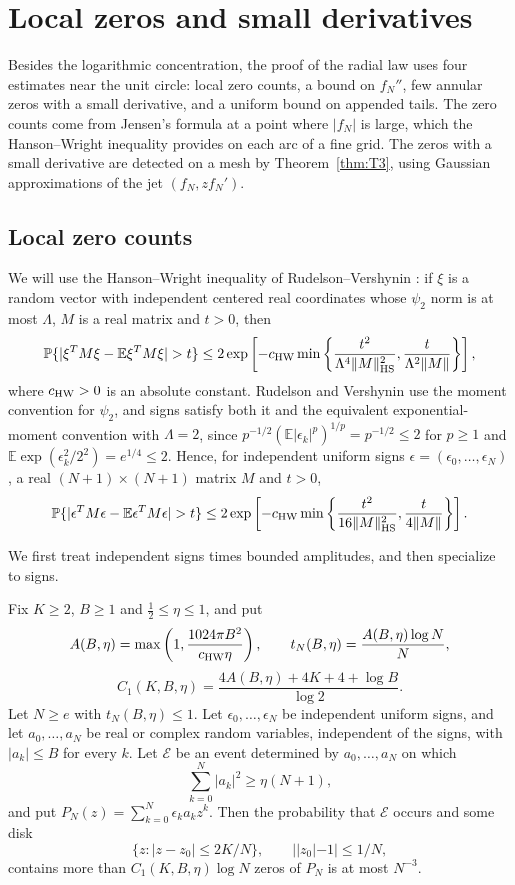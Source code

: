 \section{Local zeros and small derivatives}
\label{sec:local-roots}
Besides the logarithmic concentration, the proof of the radial law uses
four estimates near the unit circle: local zero counts, a bound on
$f_N''$, few annular zeros with a small derivative, and a uniform bound on
appended tails. The zero counts come
from Jensen's formula at a point where $|f_N|$ is large, which the
Hanson--Wright inequality provides on each arc of a fine grid. The zeros
with a small derivative are detected on a mesh by
Theorem~\ref{thm:T3}, using Gaussian approximations of the jet
$(f_N,zf_N')$.

\subsection{Local zero counts}\label{sec:local-root-count}
We will use the Hanson--Wright inequality of Rudelson--Vershynin
\cite[Theorem 1.1]{RudelsonVershynin2013}: if $\xi$ is a random vector
with independent centered real coordinates whose
$\psi_2$ norm is at most $\Lambda$, $M$ is a real matrix and $t>0$, then
\[
 \Prob\{|\xi^TM\xi-\mathbb E\xi^TM\xi|>t\}
 \le2\exp\left[-c_{\rm HW}\min\left\{
 \frac{t^2}{\Lambda^4\|M\|_{\rm HS}^2},\frac{t}{\Lambda^2\|M\|}\right\}\right],
\]
where $c_{\rm HW}>0$ is an absolute constant.
Rudelson and Vershynin use the moment convention for $\psi_2$, and signs
satisfy both it and the equivalent exponential-moment convention with
$\Lambda=2$, since $p^{-1/2}(\mathbb E|\epsilon_k|^p)^{1/p}=p^{-1/2}\le2$
for $p\ge1$ and $\mathbb E\exp(\epsilon_k^2/2^2)=e^{1/4}\le2$.
Hence, for independent uniform signs $\epsilon=(\epsilon_0,\dots,\epsilon_N)$,
a real $(N+1)\times(N+1)$ matrix $M$ and $t>0$,
\begin{equation}
 \Prob\{|\epsilon^TM\epsilon-\mathbb E\epsilon^TM\epsilon|>t\}
 \le2\exp\left[-c_{\rm HW}\min\left\{
 \frac{t^2}{16\|M\|_{\rm HS}^2},\frac{t}{4\|M\|}\right\}\right].
 \label{eq:HW-signs}
\end{equation}

We first treat independent signs times bounded amplitudes, and then
specialize to signs.

\begin{lemma}
\label{lem:local-counts-general}
Fix $K\ge2$, $B\ge1$ and $\tfrac12\le\eta\le1$, and put
\[
 A(B,\eta)=\max\left(1,\frac{1024\pi B^2}{c_{\rm HW}\eta}\right),\qquad
 t_N(B,\eta)=\frac{A(B,\eta)\log N}{N},
\]
\[
 C_1(K,B,\eta)=\frac{4A(B,\eta)+4K+4+\log B}{\log2}.
\]
Let $N\ge e$ with $t_N(B,\eta)\le1$.
Let $\epsilon_0,\dots,\epsilon_N$ be independent uniform signs, and let
$a_0,\dots,a_N$ be real or complex random variables, independent of the
signs, with $|a_k|\le B$ for every $k$.
Let $\mathcal E$ be an event determined by $a_0,\dots,a_N$ on which
\[
 \sum_{k=0}^N|a_k|^2\ge\eta(N+1),
\]
and put $P_N(z)=\sum_{k=0}^N\epsilon_ka_kz^k$.
Then the probability that $\mathcal E$ occurs and some disk
\[
 \{z:|z-z_0|\le2K/N\},\qquad ||z_0|-1|\le1/N,
\]
contains more than $C_1(K,B,\eta)\log N$ zeros of $P_N$ is at most $N^{-3}$.
\end{lemma}

